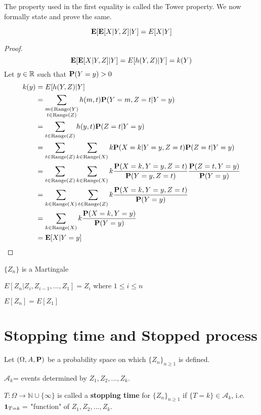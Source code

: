 \documentclass[main]{subfiles}
\begin{document}
The property used in the first equality is called the Tower property. We now formally state and prove the same.
\begin{property}
    $$\E[\E[X|Y,Z]|Y] = E[X|Y]$$
    \begin{proof}
        $$\E[\E[X|Y,Z]|Y] = E[h(Y,Z)|Y] = k(Y)$$
        Let $y \in \R$ such that $\P(Y=y) > 0$
        \begin{align*}
            k(y) & = E[h(Y,Z)|Y]                                                                                                     \\
                 & = \sum_{\substack{m \in \Range(Y)                                                                                 \\ t \in \Range(Z)}} h(m,t)\P(Y=m,Z=t|Y=y) \\
                 & = \sum_{t \in \Range(Z)} h(y,t)\P(Z=t|Y=y)                                                                        \\
                 & = \sum_{t \in \Range(Z)} \sum_{k \in \Range(X)} k \P(X=k|Y=y,Z=t)\P(Z=t|Y=y)                                      \\
                 & = \sum_{t \in \Range(Z)} \sum_{k \in \Range(X)} k \frac{\P(X=k,Y=y,Z=t)}{\P(Y=y,Z=t)} \frac{\P(Z=t,Y=y)}{\P(Y=y)} \\
                 & = \sum_{k \in \Range(X)} \sum_{t \in \Range(Z)} k \frac{\P(X=k,Y=y,Z=t)}{\P(Y=y)}                                 \\
                 & = \sum_{k \in \Range(X)} k \frac{\P(X=k,Y=y)}{\P(Y=y)}                                                            \\
                 & = \E[X|Y=y]
        \end{align*}
    \end{proof}
\end{property}


$\{Z_n\}$ is a Martingale

$E[Z_n|Z_i, Z_{i-1}, ... , Z_1]=Z_i$ where $1 \leq i \leq n$

$E[Z_n]=E[Z_1]$

\section{Stopping time and Stopped process}
\begin{definition}
    Let $(\Omega, A, \P)$ be a probability space on which $\{Z_n\}_{n\geq 1}$ is defined.

    $\mathscr{A}_k$= events determined by $Z_1, Z_2, ... ,Z_k$.

    $T: \Omega \longrightarrow \mathbb{N} \cup \{\infty\}$ is called a \textbf{stopping time} for $\{Z_n\}_{n\geq 1}$ if $\{T=k\} \in \mathscr{A}_k$, i.e.  $\1_{T=k}=$ "function" of $Z_1, Z_2, ... ,Z_k$.
\end{definition}
\end{document}

